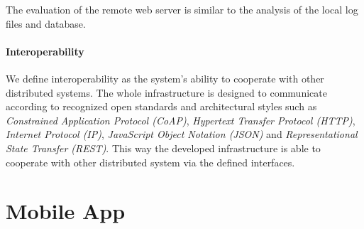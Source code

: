 The evaluation of the remote web server is similar to the analysis of the local log files and database.












\paragraph{Interoperability}

We define interoperability as the system's ability to cooperate with other distributed systems.
The whole infrastructure is designed to communicate according to recognized open standards and architectural styles such as \emph{Constrained Application Protocol (CoAP)}, \emph{Hypertext Transfer Protocol (HTTP)}, \emph{Internet Protocol (IP)}, \emph{JavaScript Object Notation (JSON)} and \emph{Representational State Transfer (REST)}.
This way the developed infrastructure is able to cooperate with other distributed system via the defined interfaces.










\section{Mobile App}
